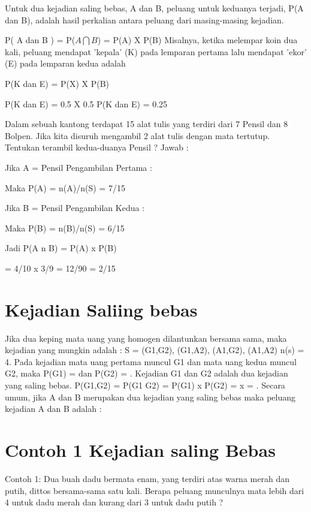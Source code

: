 \documentclass[11pt,fleqn]{book} %
\begin{document}
{Untuk dua kejadian saling bebas, A dan B, peluang untuk keduanya terjadi, P(A dan B), adalah hasil perkalian antara peluang dari masing-masing kejadian.
\vspace{1cm} 

P( A dan B ) =  P($A\bigcap B$) = P(A) X P(B)
Misalnya, ketika melempar koin dua kali, peluang mendapat 'kepala' (K) pada lemparan pertama lalu mendapat 'ekor' (E) pada lemparan kedua adalah
\vspace{1cm} 

P(K dan E) = P(X) X P(B)
\vspace{0.5in}

P(K dan E) = 0.5 X 0.5
\vspace{0.5in}
P(K dan E) = 0.25

Dalam sebuah kantong terdapat 15 alat tulis yang terdiri dari 7 Pensil dan 8
Bolpen. Jika kita disuruh mengambil 2 alat tulis dengan mata tertutup.
Tentukan terambil kedua-duanya Pensil ?
Jawab :

Jika A = Pensil Pengambilan Pertama :

Maka P(A) = n(A)/n(S) = 7/15

Jika B = Pensil Pengambilan Kedua :

Maka P(B) = n(B)/n(S) = 6/15

Jadi P(A n B) = P(A) x P(B)

= 4/10 x 3/9
= 12/90
= 2/15

\section{Kejadian Saliing bebas}
Jika dua keping mata uang yang homogen dilantunkan bersama sama, maka kejadian yang mungkin adalah : S = {(G1,G2), (G1,A2), (A1,G2), (A1,A2)} n(s) = 4.
Pada kejadian mata uang pertama muncul G1 dan  mata uang kedua muncul G2, maka P(G1) =   dan P(G2) =  . Kejadian G1 dan G2 adalah dua kejadian yang saling bebas.
P(G1,G2) = P(G1 G2) = P(G1) x P(G2) =   x   =  . Secara umum, jika A dan B merupakan dua kejadian yang saling bebas maka peluang kejadian A dan B adalah :
\section{Contoh 1 Kejadian saling Bebas}
Contoh 1:
Dua buah dadu bermata enam, yang terdiri atas warna merah dan putih, dittos bersama-sama satu kali. Berapa peluang munculnya mata lebih dari 4 untuk dadu merah dan kurang dari 3 untuk dadu putih ?

\vspace{0.5in}

}
\end{document}
